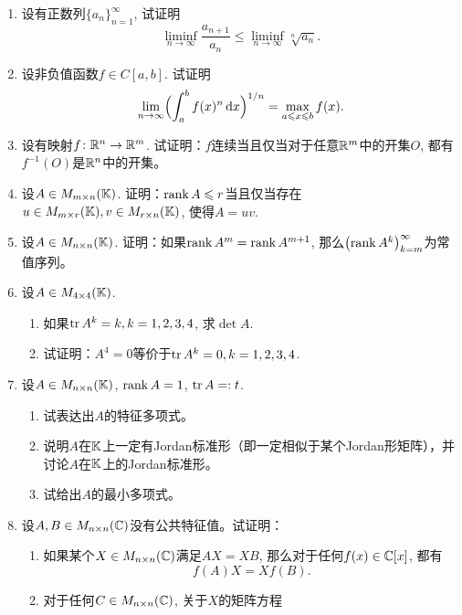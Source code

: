 \begin{enumerate}
    \item 设有正数列$\{a_n\}_{n=1}^{\infty}$, 试证明\begin{equation*}
        \liminf_{n\to\infty}\frac{a_{n+1}}{a_n}\leqslant\liminf_{n\to\infty}\sqrt[n]{a_n}.
    \end{equation*}
    \item 设非负值函数$f\in C[a,b]$. 试证明\begin{equation*}
        \lim_{n\to\infty}\Bigl(\int_a^b f(x)^n \mathop{}\!\mathrm{d} x\Bigr)^{1/n}=\max_{a\leqslant x\leqslant b}f(x).
    \end{equation*}
    \item 设有映射$f\colon\mathbb{R}^n\to\mathbb{R}^m$. 试证明：$f$连续当且仅当对于任意$\mathbb{R}^m$中的开集$O$, 都有$f^{-1}(O)$是$\mathbb{R}^n$中的开集。
    \item 设$A\in M_{m\times n}(\mathbb K)$. 证明：$\operatorname{rank} A\leqslant r$当且仅当存在$u\in M_{m\times r}(\mathbb K),v\in M_{r\times n}(\mathbb K)$, 使得$A=uv$.
    \item 设$A\in M_{n\times n}(\mathbb K)$. 证明：如果$\operatorname{rank} A^m=\operatorname{rank} A^{m+1}$, 那么$\left(\operatorname{rank} A^k\right)_{k=m}^\infty$为常值序列。
    \item 设$A\in M_{4\times 4}(\mathbb K)$. \begin{enumerate}
        \item 如果$\operatorname{tr} A^k=k,k=1,2,3,4$, 求$\det A$.
        \item 试证明：$A^4=0$等价于$\operatorname{tr} A^k=0,k=1,2,3,4$.
    \end{enumerate}
    \item 设$A\in M_{n\times n}(\mathbb K)$, $\operatorname{rank} A=1$, $\operatorname{tr} A=:t$.
    \begin{enumerate}
        \item 试表达出$A$的特征多项式。
        \item 说明$A$在$\mathbb K$上一定有Jordan标准形（即一定相似于某个Jordan形矩阵），并讨论$A$在$\mathbb K$上的Jordan标准形。
        \item 试给出$A$的最小多项式。
    \end{enumerate}
    \item 设$A,B\in M_{n\times n}(\mathbb{C})$没有公共特征值。试证明：\begin{enumerate}
        \item 如果某个$X\in M_{n\times n}(\mathbb{C})$满足$AX=XB$, 那么对于任何$f(x)\in\mathbb{C}[x]$, 都有\begin{equation*}
            f(A)X=Xf(B).
        \end{equation*}
        \item 对于任何$C\in M_{n\times n}(\mathbb{C})$, 关于$X$的矩阵方程\begin{equation*}

\end{equation*}
\end{enumerate}
\end{enumerate}
